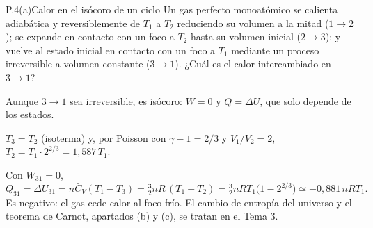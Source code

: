 \begin{problema}{P.4(a)}{Calor en el isócoro de un ciclo}
Un gas perfecto monoatómico se calienta adiabática y reversiblemente de $T_1$ a $T_2$ reduciendo su volumen a la
mitad ($1\to2$); se expande en contacto con un foco a $T_2$ hasta su volumen inicial ($2\to3$); y vuelve al estado
inicial en contacto con un foco a $T_1$ mediante un proceso irreversible a volumen constante ($3\to1$). ¿Cuál es el
calor intercambiado en $3\to1$?
\end{problema}

\begin{resolucion}
\idea Aunque $3\to1$ sea irreversible, es isócoro: $W=0$ y $Q=\Delta U$, que solo depende de los estados.

 $T_3=T_2$ (isoterma) y, por Poisson con $\gamma-1=2/3$ y $V_1/V_2=2$,
$T_2=T_1\cdot2^{2/3}=1{,}587\,T_1$.

 Con $W_{31}=0$,
\[
  Q_{31}=\Delta U_{31}=n\bar C_V(T_1-T_3)=\boxed{\tfrac32nR\,(T_1-T_2)}=\tfrac32nRT_1\bigl(1-2^{2/3}\bigr)\simeq-0{,}881\,nRT_1 .
\]
Es negativo: el gas cede calor al foco frío. El cambio de entropía del universo y el teorema de Carnot,
apartados (b) y (c), se tratan en el Tema 3.
\end{resolucion}

